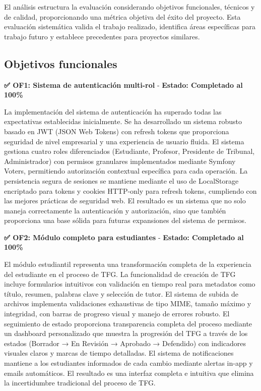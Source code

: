 \documentclass[12pt,a4paper,oneside]{report}
\begin{document}
El análisis estructura la evaluación considerando objetivos funcionales, técnicos y de calidad, proporcionando una métrica objetiva del éxito del proyecto. Esta evaluación sistemática valida el trabajo realizado, identifica áreas específicas para trabajo futuro y establece precedentes para proyectos similares.

\subsection{Objetivos funcionales}\label{objetivos-funcionales}

\textbf{✅ OF1: Sistema de autenticación multi-rol} - \textbf{Estado: Completado al 100\%}

La implementación del sistema de autenticación ha superado todas las expectativas establecidas inicialmente. Se ha desarrollado un sistema robusto basado en JWT (JSON Web Tokens) con refresh tokens que proporciona seguridad de nivel empresarial y una experiencia de usuario fluida. El sistema gestiona cuatro roles diferenciados (Estudiante, Profesor, Presidente de Tribunal, Administrador) con permisos granulares implementados mediante Symfony Voters, permitiendo autorización contextual específica para cada operación. La persistencia segura de sesiones se mantiene mediante el uso de LocalStorage encriptado para tokens y cookies HTTP-only para refresh tokens, cumpliendo con las mejores prácticas de seguridad web. El resultado es un sistema que no solo maneja correctamente la autenticación y autorización, sino que también proporciona una base sólida para futuras expansiones del sistema de permisos.

\textbf{✅ OF2: Módulo completo para estudiantes} - \textbf{Estado: Completado al 100\%}

El módulo estudiantil representa una transformación completa de la experiencia del estudiante en el proceso de TFG. La funcionalidad de creación de TFG incluye formularios intuitivos con validación en tiempo real para metadatos como título, resumen, palabras clave y selección de tutor. El sistema de subida de archivos implementa validaciones exhaustivas de tipo MIME, tamaño máximo y integridad, con barras de progreso visual y manejo de errores robusto. El seguimiento de estado proporciona transparencia completa del proceso mediante un dashboard personalizado que muestra la progresión del TFG a través de los estados (Borrador → En Revisión → Aprobado → Defendido) con indicadores visuales claros y marcas de tiempo detalladas. El sistema de notificaciones mantiene a los estudiantes informados de cada cambio mediante alertas in-app y emails automáticos. El resultado es una interfaz completa e intuitiva que elimina la incertidumbre tradicional del proceso de TFG.
\end{document}
